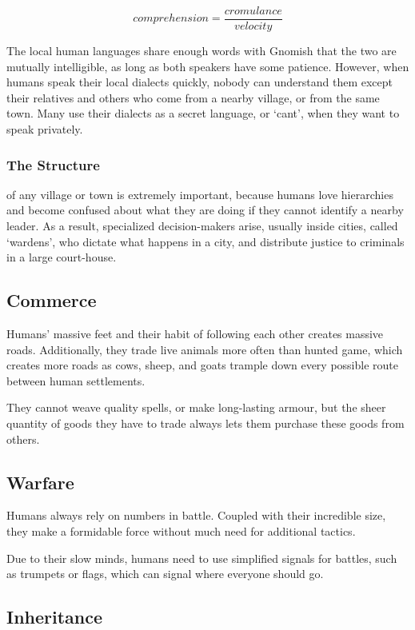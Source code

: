 \begin{multicols}{2}
$$ comprehension = \frac{cromulance}{velocity} $$

The local human languages share enough words with Gnomish that the two are mutually intelligible, as long as both speakers have some patience.
However, when humans speak their local dialects quickly, nobody can understand them except their relatives and others who come from a nearby \gls{village}, or from the same town.
Many use their dialects as a secret language, or `cant', when they want to speak privately.

\subsubsection{The Structure}
of any \gls{village} or town is extremely important, because humans love hierarchies and become confused about what they are doing if they cannot identify a nearby leader.
As a result, specialized decision-makers arise, usually inside cities, called `\glspl{warden}', who dictate what happens in a city, and distribute justice to criminals in a large court-house.

\subsection{Commerce}

Humans' massive feet and their habit of following each other creates massive roads.
Additionally, they trade live animals more often than hunted game, which creates more roads as cows, sheep, and goats trample down every possible route between human settlements.

They cannot weave quality spells, or make long-lasting armour, but the sheer quantity of goods they have to trade always lets them purchase these goods from others.

\subsection{Warfare}
Humans always rely on numbers in battle.
Coupled with their incredible size, they make a formidable force without much need for additional tactics.

Due to their slow minds, humans need to use simplified signals for battles, such as trumpets or flags, which can signal where everyone should go.

\subsection{Inheritance}


\end{multicols}
